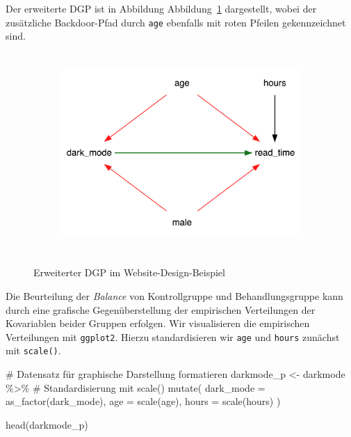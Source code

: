 \documentclass[
  a4paper,
  DIV=11,
  oneside]{scrreprt}
\newenvironment{Shaded}{\begin{snugshade}}{\end{snugshade}}
\newcommand{\AttributeTok}[1]{\textcolor[rgb]{0.40,0.45,0.13}{#1}}
\newcommand{\CommentTok}[1]{\textcolor[rgb]{0.37,0.37,0.37}{#1}}
\newcommand{\FunctionTok}[1]{\textcolor[rgb]{0.28,0.35,0.67}{#1}}
\newcommand{\NormalTok}[1]{\textcolor[rgb]{0.00,0.23,0.31}{#1}}
\newcommand{\OtherTok}[1]{\textcolor[rgb]{0.00,0.23,0.31}{#1}}
\newcommand{\SpecialCharTok}[1]{\textcolor[rgb]{0.37,0.37,0.37}{#1}}
\begin{document}
Der erweiterte DGP ist in Abbildung Abbildung~\ref{fig-CDdarkmode}
dargestellt, wobei der zusätzliche Backdoor-Pfad durch \texttt{age}
ebenfalls mit roten Pfeilen gekennzeichnet sind.

\begin{figure}

{\centering 

\begin{figure}[H]

{\centering \includegraphics[width=4in,height=3in]{Matching_files/figure-latex/dot-figure-3.png}

}

\end{figure}

}

\caption{\label{fig-CDdarkmode}Erweiterter DGP im
Website-Design-Beispiel}

\end{figure}

Die Beurteilung der \emph{Balance} von Kontrollgruppe und
Behandlungsgruppe kann durch eine grafische Gegenüberstellung der
empirischen Verteilungen der Kovariablen beider Gruppen erfolgen. Wir
visualisieren die empirischen Verteilungen mit \texttt{ggplot2}. Hierzu
standardisieren wir \texttt{age} und \texttt{hours} zunächst mit
\texttt{scale()}.

\begin{Shaded}
\begin{Highlighting}[]
\CommentTok{\# Datensatz für graphische Darstellung formatieren}
\NormalTok{darkmode\_p }\OtherTok{\textless{}{-}}\NormalTok{ darkmode }\SpecialCharTok{\%\textgreater{}\%} 
  \CommentTok{\# Standardisierung mit \textquotesingle{}scale()\textquotesingle{}}
  \FunctionTok{mutate}\NormalTok{(}
    \AttributeTok{dark\_mode =} \FunctionTok{as\_factor}\NormalTok{(dark\_mode),}
    \AttributeTok{age =} \FunctionTok{scale}\NormalTok{(age), }
    \AttributeTok{hours =} \FunctionTok{scale}\NormalTok{(hours)}
\NormalTok{  )}

\FunctionTok{head}\NormalTok{(darkmode\_p)}
\end{Highlighting}
\end{Shaded}
\end{document}
